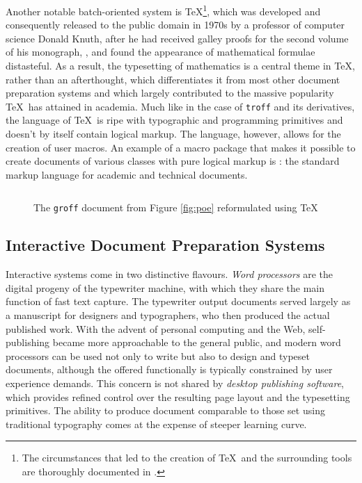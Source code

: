 \documentclass{book}
\begin{document}
Another notable batch-oriented system is \TeX{}\footnote{
  The circumstances that led to the creation of \TeX\ and the surrounding tools
  are thoroughly documented in \cite{knuth98}.
}, which was developed and consequently released to the public domain in 1970s
by a professor of computer science Donald Knuth, after he had received galley
proofs for the second volume of his monograph, , and found the appearance of mathematical formulae distasteful.
As a result, the typesetting of mathematics is a central theme in \TeX, rather
than an afterthought, which differentiates it from most other document
preparation systems and which largely contributed to the massive popularity
\TeX\ has attained in academia. Much like in the case of \texttt{troff} and its
derivatives, the language of \TeX\ is ripe with typographic and programming
primitives and doesn't by itself contain logical markup. The language, however,
allows for the creation of user macros. An example of a macro package that
makes it possible to create documents of various classes with pure logical
markup is \inx{\LaTeX}: the standard markup language for academic and technical
documents.

\begin{figure}
  \inputminted{tex}{examples/02/poe.tex}
  \caption{The \texttt{groff} document from Figure \ref{fig:poe} reformulated
    using \TeX}
\end{figure}

\subsection{Interactive Document Preparation Systems}
Interactive systems come in two distinctive flavours. \emph{Word processors}
 are
the digital progeny of the typewriter machine, with which they share the main
function of fast text capture. The typewriter output documents served largely as
a manuscript for designers and typographers, who then produced the actual
published work. With the advent of personal computing and the Web,
self-publishing became more approachable to the general public, and modern word
processors can be used not only to write but also to design and typeset
documents, although the offered functionally is typically constrained by user
experience demands. This concern is not shared by \emph{desktop publishing
software},
which provides refined control over the resulting page layout and the
typesetting primitives. The ability to produce document comparable to those set
using traditional typography comes at the expense of steeper learning curve.
\end{document}
